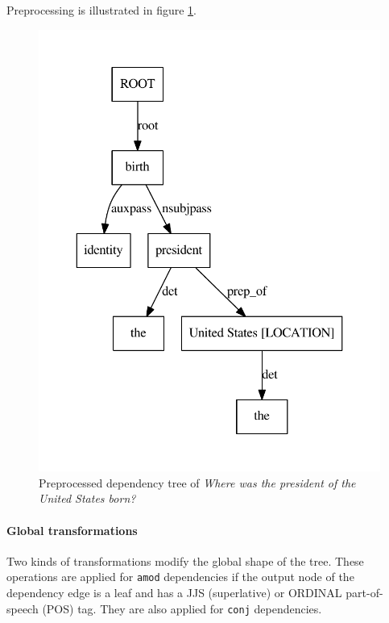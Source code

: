 Preprocessing is illustrated in figure \ref{tree_two}.

\begin{figure}
  \centering
    \includegraphics[scale=0.6]{../examples_NLP_grammatical/tree2bis.pdf}
  \caption{Preprocessed dependency tree of \emph{Where was the president of the United States born?}}
  \label{tree_two}
\end{figure}


\paragraph{Global transformations}
\label{glt}

Two kinds of transformations modify the global shape of the tree. These operations are applied for \texttt{amod} dependencies if the output node of the dependency edge is a leaf and has a JJS (superlative) or ORDINAL part-of-speech (POS) tag. They are also applied for \texttt{conj} dependencies. 

